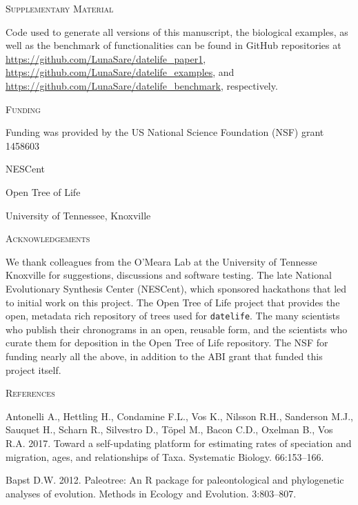 \documentclass[]{article}
\begin{document}
\begin{center}
\textsc{Supplementary Material}
\end{center}

Code used to generate all versions of this manuscript, the biological examples, as well as the benchmark of functionalities can be found in GitHub repositories at \url{https://github.com/LunaSare/datelife_paper1}, \url{https://github.com/LunaSare/datelife_examples}, and \url{https://github.com/LunaSare/datelife_benchmark}, respectively.

\begin{center}
\textsc{Funding}
\end{center}

Funding was provided by the US National Science Foundation (NSF) grant 1458603

NESCent

Open Tree of Life

University of Tennessee, Knoxville

\begin{center}
\textsc{Acknowledgements}
\end{center}

We thank colleagues from the O'Meara Lab at the University
of Tennesse Knoxville for suggestions, discussions and software testing.
The late National Evolutionary Synthesis Center (NESCent), which sponsored hackathons
that led to initial work on this project.
The Open Tree of Life project that provides the open, metadata rich repository of
trees used for \texttt{datelife}.
The many scientists who publish their chronograms in an open, reusable form, and
the scientists who curate them for deposition in the Open Tree of Life repository.
The NSF for funding nearly all the above, in addition
to the ABI grant that funded this project itself.

\newpage

\begin{center}
\textsc{References}
\end{center}

\hypertarget{refs}{}
\leavevmode\hypertarget{ref-antonelli2017supersmart}{}%
Antonelli A., Hettling H., Condamine F.L., Vos K., Nilsson R.H., Sanderson M.J., Sauquet H., Scharn R., Silvestro D., Töpel M., Bacon C.D., Oxelman B., Vos R.A. 2017. Toward a self-updating platform for estimating rates of speciation and migration, ages, and relationships of Taxa. Systematic Biology. 66:153--166.

\leavevmode\hypertarget{ref-Bapst2012a}{}%
Bapst D.W. 2012. Paleotree: An R package for paleontological and phylogenetic analyses of evolution. Methods in Ecology and Evolution. 3:803--807.
\end{document}
